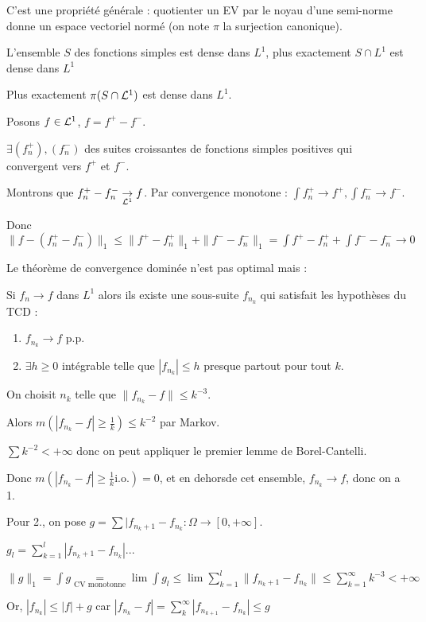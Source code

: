 \documentclass[10pt,a4paper,notitlepage ]{report}
\begin{document}
\begin{rem}
	C'est une propriété générale : quotienter un EV par le noyau d'une semi-norme donne un espace vectoriel normé (on note $\pi$ la surjection canonique).
\end{rem}

\begin{propriete}
	L'ensemble $S$ des fonctions simples est dense dans $L^1$, plus exactement $S\cap L^1$ est dense dans $L^1$
\end{propriete}

\begin{rem}
	Plus exactement $\pi(S\cap\mathcal L^1)$ est dense dans $L^1$.
\end{rem}

\begin{demo}
	Posons $f\in \mathcal L^1$, $f=f^+ - f^-$.
	
	$\exists(f_n^+),(f_n^-)$ des suites croissantes de fonctions simples positives qui convergent vers $f^+$ et $f^-$.
	
	Montrons que $f_n^+-f_n^- \underset{\mathcal L^1}{\rightarrow} f$. Par convergence monotone : $\int f_n^+ \rightarrow f^+, \int f_n^- \rightarrow f^-$.
	
	Donc $\|f-(f_n^+-f_n^-)\|_1 \le \|f^+-f_n^+\|_1 + \|f^- - f_n^-\|_1 = \int f^+ - f_n^+ + \int f^--f_n^-  \rightarrow 0$ 
\end{demo}

Le théorème de convergence dominée n'est pas optimal mais :

\begin{propriete}
	Si $f_n \rightarrow f$ dans $L^1$ alors ils existe une sous-suite $f_{n_k}$ qui satisfait les hypothèses du TCD : 
	\begin{enumerate}
		\item $f_{n_k} \rightarrow f$ p.p.
		\item $\exists h \ge 0$ intégrable telle que $|f_{n_k}| \le h$ presque partout pour tout $k$.
	\end{enumerate}
\end{propriete}

\begin{demo}
	On choisit $n_k$ telle que $\|f_{n_k}-f\| \le k^{-3}$.
	
	Alors $m(|f_{n_k}-f| \ge \frac 1 k) \le k ^{-2}$ par Markov.
	
	$\sum k^{-2} < +\infty$ donc on peut appliquer le premier lemme de Borel-Cantelli.
	
	Donc $m(|f_{n_k}-f| \ge \frac 1 k \text{i.o.}) = 0$, et en dehorsde cet ensemble, $f_{n_k} \rightarrow f$, donc on a 1.
	
	Pour 2., on pose $g = \sum |f_{n_k + 1} - f_{n_k} : \Omega \rightarrow [0,+\infty]$.
	
	$g_l = \sum_{k=1}^l |f_{n_k+1} - f_{n_k}| ...$ %
	
	$\|g\|_1 = \int g \underset{\text{CV monotonne}} = \lim \int g_l \le \lim \sum_{k=1}^l \|f_{n_k+1} - f_{n_k}\| \le \sum_{k=1}^\infty k^{-3} < +\infty$
	
	Or, $|f_{n_k}| \le |f| + g$ car $|f_{n_k} - f| = \sum_k^\infty|f_{n_{k+1}} - f_{n_k}| \le g$
\end{demo}
\end{document}
